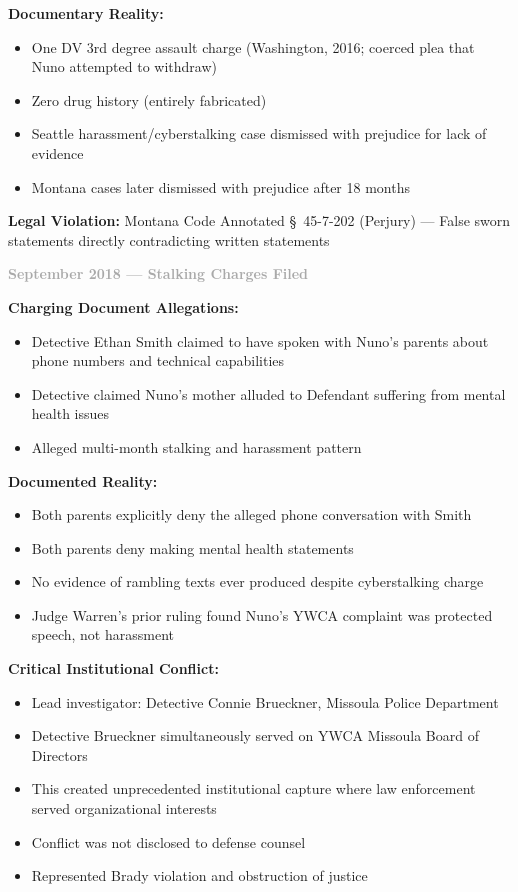 \documentclass[11pt, letterpaper]{article}
\newcommand{\subsubsectiontitle}[1]{\vspace{0.1in}\noindent\textcolor{DarkGray}{\textbf{#1}}\vspace{0.05in}}
\begin{document}
\textbf{Documentary Reality:}
\begin{itemize}[leftmargin=*,itemsep=2pt]
    \item One DV 3rd degree assault charge (Washington, 2016; coerced plea that Nuno attempted to withdraw)
    \item Zero drug history (entirely fabricated)
    \item Seattle harassment/cyberstalking case dismissed with prejudice for lack of evidence
    \item Montana cases later dismissed with prejudice after 18 months
\end{itemize}

\textbf{Legal Violation:} Montana Code Annotated \S\ 45-7-202 (Perjury) --- False sworn statements directly contradicting written statements

\subsubsectiontitle{September 2018 --- Stalking Charges Filed}

\textbf{Charging Document Allegations:}
\begin{itemize}[leftmargin=*,itemsep=2pt]
    \item Detective Ethan Smith claimed to have spoken with Nuno's parents about phone numbers and technical capabilities
    \item Detective claimed Nuno's mother alluded to Defendant suffering from mental health issues
    \item Alleged multi-month stalking and harassment pattern
\end{itemize}

\textbf{Documented Reality:}
\begin{itemize}[leftmargin=*,itemsep=2pt]
    \item Both parents explicitly deny the alleged phone conversation with Smith
    \item Both parents deny making mental health statements
    \item No evidence of rambling texts ever produced despite cyberstalking charge
    \item Judge Warren's prior ruling found Nuno's YWCA complaint was protected speech, not harassment
\end{itemize}

\textbf{Critical Institutional Conflict:}
\begin{itemize}[leftmargin=*,itemsep=2pt]
    \item Lead investigator: Detective Connie Brueckner, Missoula Police Department
    \item Detective Brueckner simultaneously served on YWCA Missoula Board of Directors
    \item This created unprecedented institutional capture where law enforcement served organizational interests
    \item Conflict was not disclosed to defense counsel
    \item Represented Brady violation and obstruction of justice
\end{itemize}
\end{document}
